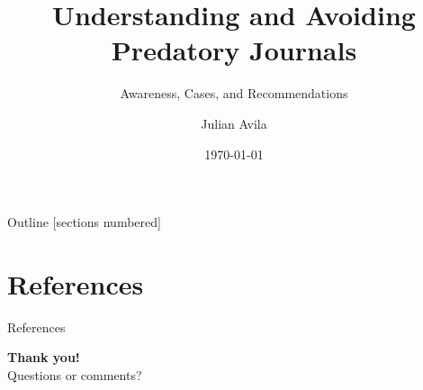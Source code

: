 \documentclass[aspectratio=169,sn-mathphys-num]{beamer}
\title{Understanding and Avoiding Predatory Journals}
\subtitle{Awareness, Cases, and Recommendations}
\author{Julian Avila}
\institute{Universidad Distrital Francisco José de Caldas}
\date{\today}
\begin{document}
\begin{frame}
	\titlepage
\end{frame}

\begin{frame}{Outline}
	[sections numbered]
	\tableofcontents
\end{frame}



\section{References}
\begin{frame}[allowframebreaks]{References}
	\printbibliography
	\nocite{*}
\end{frame}

\begin{frame}[plain]
\centering
\vspace{1cm}
{\Huge \textbf{Thank you!}}\\[1cm]
{\large Questions or comments?}
\end{frame}
\end{document}
